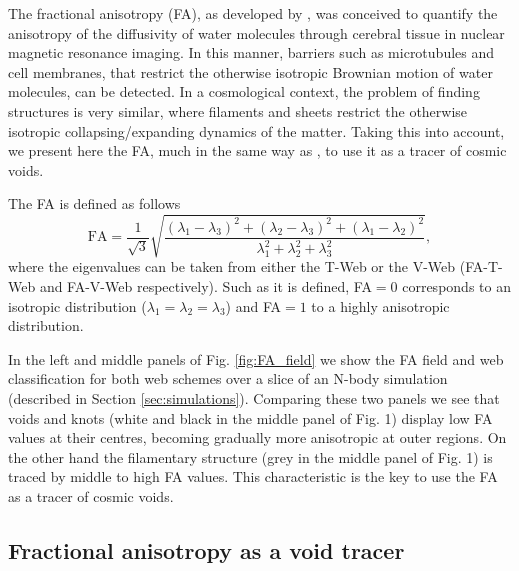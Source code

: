 \documentclass[a4,useAMS,usenatbib,usegraphicx]{mn2e}
\newcommand{\eq}[2]{\begin{equation} \label{eq:#1} #2 \end{equation}}
\begin{document}

The fractional anisotropy (FA), as developed by \citet{Basser95}, 
was conceived to quantify the anisotropy of the diffusivity of water
molecules through cerebral tissue in nuclear magnetic resonance imaging. 
In this manner, barriers such as microtubules and cell membranes, that 
restrict the otherwise isotropic Brownian motion of water molecules, can 
be detected. In a cosmological context, the problem of finding structures 
is very similar, where filaments and sheets restrict the otherwise 
isotropic collapsing/expanding dynamics of the matter. Taking this into 
account, we present here the FA, much in the same way as \citet{Libeskind13}, 
to use it as a tracer of cosmic voids.


The FA is defined as follows
\eq{fractional_anisotropy}
{{\mathrm{FA}} = \frac{1}{\sqrt{3}}\sqrt{ \frac{ (\lambda_1 - \lambda_3)^2 + 
(\lambda_2 - \lambda_3)^2 + (\lambda_1 - \lambda_2)^2}{ \lambda_1^2 + 
\lambda_2^2 + \lambda_3^2} },}
where the eigenvalues can be taken from either the T-Web or the V-Web 
(FA-T-Web and FA-V-Web respectively). Such as it is defined, FA$=0$ 
corresponds to an isotropic distribution ($\lambda_1=\lambda_2=\lambda_3$) 
and FA$=1$ to a highly anisotropic distribution.


In the left and middle panels of Fig. \ref{fig:FA_field} we show the
FA field and web classification for both  web schemes over a slice of
an N-body simulation (described in Section \ref{sec:simulations}). 
Comparing these two panels we see that voids and knots (white
and black in the middle panel of Fig. 1) display low FA values at
their  centres, becoming gradually more anisotropic at outer regions.  
On the other hand the filamentary structure (grey in the middle panel
of Fig. 1) is traced by middle to high FA values.  
This characteristic is the  key to use the FA as a tracer of cosmic
voids.  


\subsection{Fractional anisotropy as a void tracer}
\label{subsec:web_voids}
\end{document}
